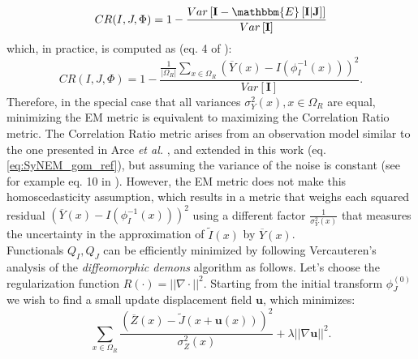 \begin{equation}
    CR(I, J, \Phi) = 1 - \frac{Var\left[ \mathbf{I} - \mathbbm{E}\left[ \mathbf{I} | \mathbf{J}\right] \right]}{Var\left[ \mathbf{I} \right]}
\end{equation}
which, in practice, is computed as (eq. 4 of \cite{Roche1998}):
\begin{equation}
    CR(I, J, \Phi) = 1 - \frac{\frac{1}{|\Omega_{R}|}\sum_{x \in \Omega_{R}} \left(\overline{Y}(x) - I(\phi_{I}^{-1}(x))\right)^{2}}{Var\left[ \mathbf{I} \right]}.
\end{equation}
Therefore, in the special case that all variances $\sigma^{2}_{Y}(x), x\in\Omega_{R}$ are equal, minimizing the EM metric is equivalent to maximizing the Correlation Ratio metric. The Correlation Ratio metric arises from an observation model similar to the one presented in Arce {\it et al.} \cite{Arce-santana2014}, and extended in this work (eq. \eqref{eq:SyNEM_gom_ref}), but assuming the variance of the noise is constant (see for example eq. 10 in \cite{Roche2000}). However, the EM metric does not make this homoscedasticity assumption, which results in a metric that weighs each squared residual $\left(\overline{Y}(x) - I(\phi_{I}^{-1}(x))\right)^{2}$ using a different factor $\frac{1}{\sigma^{2}_{Y}(x)}$ that measures the uncertainty in the approximation of $\tilde{I}(x)$ by $\overline{Y}(x)$.\\

Functionals $Q_{I}, Q_{J}$ can be efficiently minimized by following Vercauteren's analysis of the \textit{diffeomorphic demons} algorithm \cite{Vercauteren2009} as follows.
Let's choose the regularization function $R(\cdot) = ||\nabla \cdot||^{2}$. Starting from the initial transform $\phi^{(0)}_{J}$ we wish to find a small update displacement field $\mathbf{u}$, which minimizes:
\begin{equation}\label{eq:vercauteren_cost}
    \sum_{x \in \Omega_{R}} \frac{\left(\overline{Z}(x) - \tilde{J}(x + \mathbf{u}(x))\right)^{2}}{\sigma^{2}_{Z}(x)} + \lambda ||\nabla \mathbf{u}||^{2}.
\end{equation}

